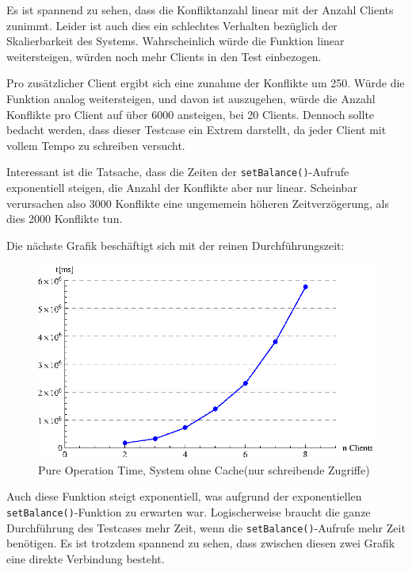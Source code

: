 Es ist spannend zu sehen, dass die Konfliktanzahl linear mit der Anzahl Clients zunimmt. Leider ist auch dies ein schlechtes Verhalten bezüglich der Skalierbarkeit des Systems. Wahrscheinlich würde die Funktion linear weitersteigen, würden noch mehr Clients in den Test einbezogen. 

Pro zusätzlicher Client ergibt sich eine zunahme der Konflikte um 250. Würde die Funktion analog weitersteigen, und davon ist auszugehen, würde die Anzahl Konflikte pro Client auf über 6000 ansteigen, bei 20 Clients. Dennoch sollte bedacht werden, dass dieser Testcase ein Extrem darstellt, da jeder Client mit vollem Tempo zu schreiben versucht. 

Interessant ist die Tatsache, dass die Zeiten der \texttt{setBalance()}-Aufrufe exponentiell steigen, die Anzahl der Konflikte aber nur linear. Scheinbar verursachen also 3000 Konflikte eine ungememein höheren Zeitverzögerung, als dies 2000 Konflikte tun. 

Die nächste Grafik beschäftigt sich mit der reinen Durchführungszeit:
\begin{figure}[H]
\begin{center}
\includegraphics[width=\textwidth]{images_MessErgebnisse/incrementCachePureOperationTime.eps}
\end{center}
\caption{Pure Operation Time, System ohne Cache(nur schreibende Zugriffe)}
\end{figure}

Auch diese Funktion steigt exponentiell, was aufgrund der exponentiellen \texttt{setBalance()}-Funktion zu erwarten war. Logischerweise braucht die ganze Durchführung des Testcases mehr Zeit, wenn die \texttt{setBalance()}-Aufrufe mehr Zeit benötigen. Es ist trotzdem spannend zu sehen, dass zwischen diesen zwei Grafik eine direkte Verbindung besteht.

